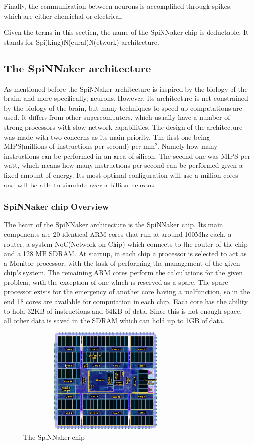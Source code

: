 \documentclass[12pt,a4paper]{article}
\begin{document}
Finally, the communication between neurons is accomplihed through spikes, which are either chemichal or electrical\cite{gerstner2002spiking}.

Given the terms in this section, the name of the SpiNNaker chip is deductable. It stands for Spi(king)N(eural)N(etwork) architecture.
\subsection{The SpiNNaker architecture}
As mentioned before the SpiNNaker architecture is inspired by the biology of the brain, and more specifically, neurons. However, its architecture is not constrained by the biology of the brain, but many techniques to speed up computations are used. It differs from other supercomputers, which  usually have a number of strong processors with slow network capabilities. The design of the architecture was made with two concerns as its main priority. The first one being MIPS(millions of instructions per-second) per mm$^2$. Namely how many instructions can be performed in an area of silicon. The second one was MIPS per watt, which means how many instructions per second can be performed given a fixed amount of energy. Its most optimal configuration will use a million cores and will be able to simulate over a billion neurons\cite{furber2007neural}.
\subsubsection {SpiNNaker chip Overview}
The heart of the SpiNNaker architecture is the SpiNNaker chip. Its main components are 20 identical ARM cores that run at around 100Mhz each, a router, a system NoC(Network-on-Chip) which connects to the router of the chip and a 128 MB SDRAM. At startup, in each chip a processor is selected to act as a Monitor processor, with the task of performing the management of the given chip's system. The remaining ARM cores perform the calculations for the given problem, with the exception of one which is reserved as a spare. The spare processor exists for the emergency of another core having a malfunction, so in the end 18 cores are available for computation in each chip\cite{furber2007neural}. Each core has the ability to hold 32KB of instructions and 64KB of data. Since this is not enough space, all other data is saved in the SDRAM which can hold up to 1GB of data\cite{navaridas2009understanding}.
\begin{figure}[h!]
\includegraphics[width=250pt,height=150pt,scale=2]{Pics/chip.png}
\centering
\caption{The SpiNNaker chip\cite{spinnweb}}
\end{figure}
\end{document}
